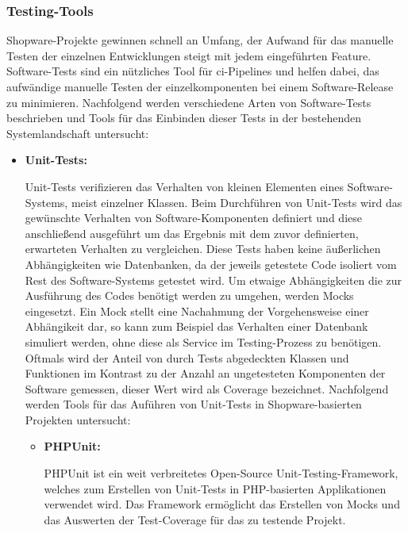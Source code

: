 \subsubsection{Testing-Tools}

Shopware-Projekte gewinnen schnell an Umfang, der Aufwand für das manuelle Testen der einzelnen Entwicklungen steigt mit
jedem eingeführten Feature.
Software-Tests sind ein nützliches Tool für \acrshort{ci}-Pipelines und helfen dabei, das aufwändige manuelle Testen
der einzelkomponenten bei einem Software-Release zu minimieren.
Nachfolgend werden verschiedene Arten von Software-Tests beschrieben und Tools für das Einbinden dieser Tests in der
bestehenden Systemlandschaft untersucht:

\begin{itemize}
    \item {
        \textbf{Unit-Tests:}\par
        Unit-Tests verifizieren das Verhalten von kleinen Elementen eines Software-Systems, meist einzelner Klassen.
        Beim Durchführen von Unit-Tests wird das gewünschte Verhalten von Software-Komponenten definiert und
        diese anschließend ausgeführt um das Ergebnis mit dem zuvor definierten, erwarteten Verhalten zu vergleichen.
        Diese Tests haben keine äußerlichen Abhängigkeiten wie Datenbanken, da der jeweils getestete Code isoliert
        vom Rest des Software-Systems getestet wird.
        Um etwaige Abhängigkeiten die zur Ausführung des Codes benötigt werden zu umgehen, werden Mocks eingesetzt.
        Ein Mock stellt eine Nachahmung der Vorgehensweise einer Abhängikeit dar, so kann zum Beispiel das Verhalten
        einer Datenbank simuliert werden, ohne diese als Service im Testing-Prozess zu benötigen.
        Oftmals wird der Anteil von durch Tests abgedeckten Klassen und Funktionen im Kontrast zu der Anzahl an
        ungetesteten Komponenten der Software gemessen, dieser Wert wird als Coverage bezeichnet.
        Nachfolgend werden Tools für das Auführen von Unit-Tests in Shopware-basierten Projekten untersucht:

        \begin{itemize}
            \item {
                \textbf{PHPUnit:}\par
                PHPUnit ist ein weit verbreitetes Open-Source Unit-Testing-Framework, welches zum Erstellen von
                Unit-Tests in PHP-basierten Applikationen verwendet wird.
                Das Framework ermöglicht das Erstellen von Mocks und das Auswerten der Test-Coverage für das zu
                testende Projekt.
            }


\end{itemize}}
\end{itemize}
